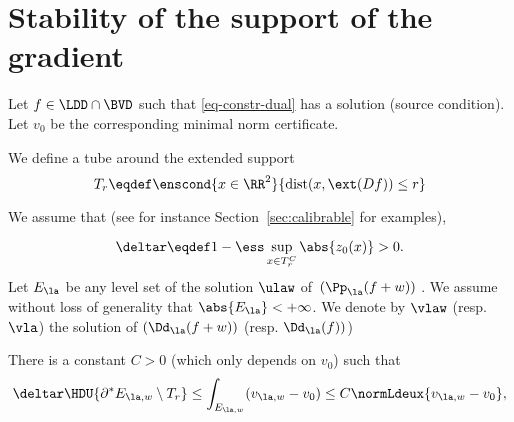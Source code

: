 
\section{Stability of the support of the gradient}\label{sec:stab_grad}


Let $f\in \LDD \cap \BVD$ such that \eqref{eq-constr-dual} has a solution (source condition). 
Let $v_0$ be the corresponding minimal norm certificate.

We define a tube around the extended support
\begin{equation}
  T_r\eqdef \enscond{x\in \RR^2}{\mathrm{dist}(x,\ext(Df))\leq r }
\end{equation}

We assume that (see for instance Section~\ref{sec:calibrable} for examples),

\begin{equation*}
  \deltar\eqdef 1-\ess \sup_{x\in T_r^C} \abs{z_0(x)}>0.\label{eq:defer}
\end{equation*}
Let $E_\la$ be any level set of the solution $\ulaw$ of~$(\Pp_\la(f+w))$ . We assume without loss of generality that $\abs{E_\la}<+\infty$. We denote by $\vlaw$ (resp. $\vla$) the solution of $(\Dd_\la(f+w))$ (resp. $\Dd_\la(f))$)

 


\begin{prop}\label{prop:partoutsidetube}
  There is a constant $C>0$ (which only depends on $v_0$) such that 
\begin{equation}
  \deltar \HDU{\partial^*E_{\la,w}\setminus T_r}\leq \int_{E_{\la,w}}(v_{\la,w} - v_0)\leq C\normLdeux{v_{\la,w}-v_0},
\end{equation}
\end{prop}


